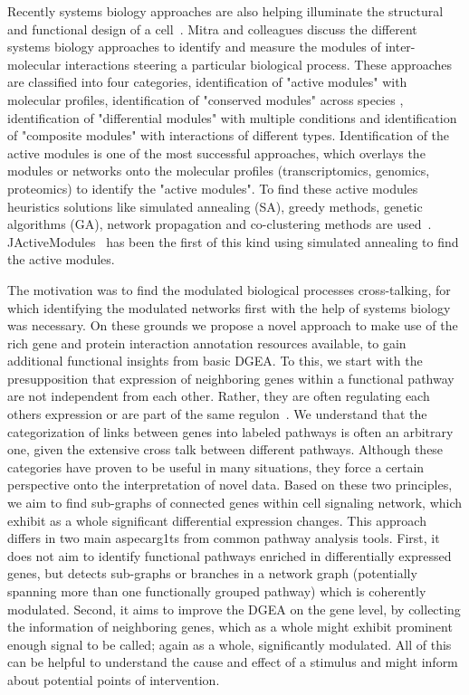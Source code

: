 \documentclass[10pt,a4paper,twocolumn]{article}
\newcommand{\DONE}[1]{\begingroup\color{blue}#1\endgroup}
\begin{document}
	\DONE{Recently systems biology approaches are also helping illuminate the structural and functional design of a cell~\cite{mitra_carvunis_ramesh_ideker_2013}. Mitra and colleagues discuss the different systems biology approaches to identify and measure the modules of inter-molecular interactions steering a particular biological process. These approaches are classified into four categories, identification of "active modules" with molecular profiles, identification of "conserved modules" across species , identification of "differential modules" with multiple conditions and identification of "composite modules" with interactions of different types. Identification of the active modules is one of the most successful approaches, which overlays the modules or networks onto the molecular profiles (transcriptomics, genomics, proteomics) to identify the "active modules". To find these active modules heuristics solutions like simulated annealing (SA), greedy methods, genetic algorithms (GA), network propagation and co-clustering methods are used~\cite{mitra_carvunis_ramesh_ideker_2013}. JActiveModules~\cite{jActiveModules} has been the first of this kind using simulated annealing to find the active modules.}
	
	\DONE{The motivation was to find the modulated biological processes cross-talking, for which identifying the modulated networks first with the help of systems biology was necessary.} On these grounds we propose a novel approach to make use of the rich gene
	and protein interaction annotation resources available, to gain additional
	functional insights from basic DGEA. To this, we start with the
	presupposition that expression of neighboring genes within a functional
	pathway are not independent from each other. Rather, they are often
	regulating each others expression or are part of the same
	regulon~\cite{Michalak}. We understand that the categorization of links
	between genes into labeled pathways is often an arbitrary one, given the
	extensive cross talk between different pathways. Although these categories
	have proven to be useful in many situations, they force a certain
	perspective onto the interpretation of novel data. Based on these two
	principles, we aim to find sub-graphs of connected genes within cell
	signaling network, which exhibit as a whole significant differential
	expression changes. This approach differs in two main aspecarg1ts from common
	pathway analysis tools. First, it does not aim to identify functional
	pathways enriched in differentially expressed genes, but detects sub-graphs
	or branches in a network graph (potentially spanning more than one
	functionally grouped pathway) which is coherently modulated. Second, it
	aims to improve the DGEA on the gene level, by collecting the information
	of neighboring genes, which as a whole might exhibit prominent enough
	signal to be called; again as a whole, significantly modulated. All of this can be helpful to understand the cause and effect of a stimulus and might inform about potential points of intervention.
	
\end{document}
